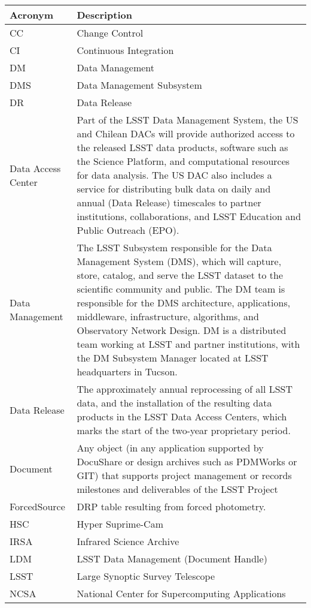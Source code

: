 \addtocounter{table}{-1}
\begin{longtable}{|l|p{}|}\hline
\textbf{Acronym} & \textbf{Description}  \\\hline

CC & Change Control \\\hline
CI & Continuous Integration \\\hline
DM & Data Management \\\hline
DMS & Data Management Subsystem \\\hline
DR & Data Release \\\hline
Data Access Center & Part of the LSST Data Management System, the US and Chilean DACs will provide authorized access to the released LSST data products, software such as the Science Platform, and computational resources for data analysis. The US DAC also includes a service for distributing bulk data on daily and annual (Data Release) timescales to partner institutions, collaborations, and LSST Education and Public Outreach (EPO).  \\\hline
Data Management & The LSST Subsystem responsible for the Data Management System (DMS), which will capture, store, catalog, and serve the LSST dataset to the scientific community and public. The DM team is responsible for the DMS architecture, applications, middleware, infrastructure, algorithms, and Observatory Network Design. DM is a distributed team working at LSST and partner institutions, with the DM Subsystem Manager located at LSST headquarters in Tucson. \\\hline
Data Release & The approximately annual reprocessing of all LSST data, and the installation of the resulting data products in the LSST Data Access Centers, which marks the start of the two-year proprietary period. \\\hline
Document & Any object (in any application supported by DocuShare or design archives such as PDMWorks or GIT) that supports project management or records milestones and deliverables of the LSST Project \\\hline
ForcedSource & DRP table resulting from forced photometry. \\\hline
HSC & Hyper Suprime-Cam \\\hline
IRSA & Infrared Science Archive \\\hline
LDM & LSST Data Management (Document Handle) \\\hline
LSST & Large Synoptic Survey Telescope \\\hline
NCSA & National Center for Supercomputing Applications \\\hline

\end{longtable}
